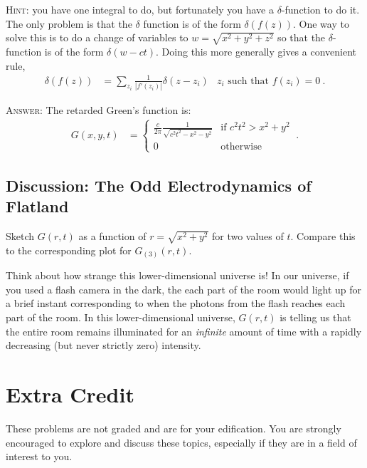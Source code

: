 \documentclass[12pt]{article}
\numberwithin{equation}{section}    %
\begin{document}
\textsc{Hint:} you have one integral to do, but fortunately you have a $\delta$-function to do it. The only problem is that the $\delta$ function is of the form $\delta\left(f(z)\right)$. One way to solve this is to do a change of variables to $w = \sqrt{x^2+y^2+z^2}$ so that the $\delta$-function is of the form $\delta(w-ct)$. Doing this more generally gives a convenient rule,
\begin{align}
	\delta\left(f(z)\right) &= \sum_{z_i} \frac{1}{|f'(z_i)|} \delta(z-z_i)
	&
	z_i \text{ such that } f(z_i) = 0 \ .
\end{align}

\textsc{Answer:} The retarded Green's function is:
\begin{align}
	G(x,y,t)  &= 
	\left\{
	\begin{array}{ll}
		\frac{c}{2\pi} \frac{1}{\sqrt{c^2 t^2 - x^2 - y^2}}
		& \text{if } c^2t^2 > x^2 + y^2\\
		0 & \text{otherwise}
	\end{array}
	\right. \ .
\end{align}


\subsection{Discussion: The Odd Electrodynamics of Flatland}

Sketch $G(r,t)$ as a function of $r = \sqrt{x^2 + y^2}$ for two values of $t$. Compare this to the corresponding plot for $G_{(3)}(r,t)$. 

Think about how strange this lower-dimensional universe is! In our universe, if you used a flash camera in the dark, the each part of the room would light up for a brief instant corresponding to when the photons from the flash reaches each part of the room. In this lower-dimensional universe, $G(r,t)$ is telling us that the entire room remains illuminated for an \emph{infinite} amount of time with a rapidly decreasing (but never strictly zero) intensity.











\appendix
\section*{\Large Extra Credit}


These problems are not graded and are for your edification. You are strongly encouraged to explore and discuss these topics, especially if they are in a field of interest to you.
\end{document}
